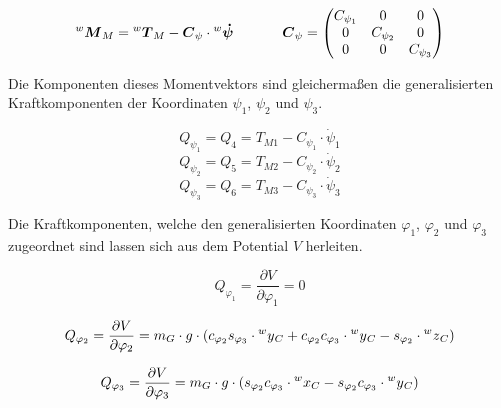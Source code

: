 \begin{equation}
\prescript{w}{}{}\boldsymbol{M}_M = \prescript{w}{}{}\boldsymbol{T}_M - \boldsymbol{C}_{\psi} \cdot \prescript{w}{}{}\boldsymbol{\dot {\psi}} \hspace{35pt} \boldsymbol{C}_{\psi} = \begin{pmatrix}
C_{\psi_1} & 0 & 0 \\
0 & C_{\psi_2} & 0 \\
0 & 0 & C_{\psi_3}
\end{pmatrix}
\end{equation}

Die Komponenten dieses Momentvektors sind gleichermaßen die generalisierten Kraftkomponenten der Koordinaten $\psi_1$, $\psi_2$ und $\psi_3$.

\begin{equation}
Q_{\psi_1} = Q_4 = T_{M1} - C_{\psi_1} \cdot \dot{\psi}_1
\end{equation}
\begin{equation}
Q_{\psi_2} = Q_5 = T_{M2} - C_{\psi_2} \cdot \dot{\psi}_2
\end{equation}
\begin{equation}
Q_{\psi_3} = Q_6 = T_{M3} - C_{\psi_3} \cdot \dot{\psi}_3
\end{equation}

Die Kraftkomponenten, welche den generalisierten Koordinaten $\varphi_1$, $\varphi_2$ und $\varphi_3$ zugeordnet sind lassen sich aus dem Potential $V$ herleiten.

\begin{equation}
Q_{\varphi_1} = \frac{\partial V}{\partial \varphi_1} = 0
\end{equation}

\begin{equation}
Q_{\varphi_2} = \frac{\partial V}{\partial \varphi_2} = m_G \cdot g \cdot (c_{\varphi_2} s_{\varphi_3} \cdot \prescript{w}{}{y}_C + c_{\varphi_2}c_{\varphi_3} \cdot \prescript{w}{}{y}_C - s_{\varphi_2} \cdot \prescript{w}{}{z}_C)
\end{equation}

\begin{equation}
Q_{\varphi_3} = \frac{\partial V}{\partial \varphi_3} = m_G \cdot g \cdot (s_{\varphi_2} c_{\varphi_3} \cdot \prescript{w}{}{x}_C - s_{\varphi_2} c_{\varphi_3} \cdot \prescript{w}{}{y}_C)
\end{equation}
